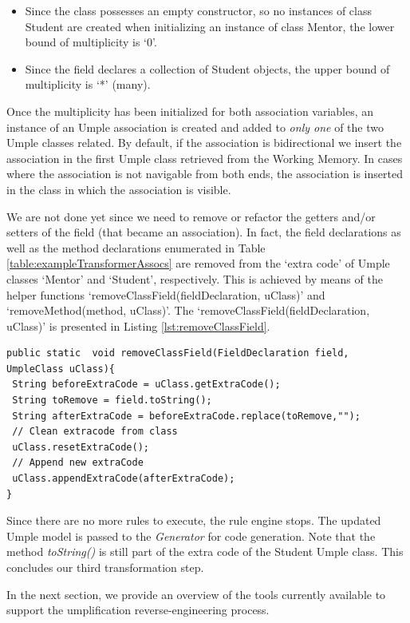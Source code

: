 \begin{itemize}
\item Since the class possesses an empty constructor, so no instances of class Student are created when initializing an instance of class Mentor, the lower bound of multiplicity is `0'.
\item Since the field declares a collection of Student objects, the upper bound of multiplicity is `*' (many).
\end{itemize}

Once the multiplicity has been initialized for both association variables, an instance of an Umple association is created and added to \textit{only one} of the two Umple classes related. By default, if the association is bidirectional we insert the association in the first Umple class retrieved from the Working Memory. In cases where the association is not navigable from both ends, the association is inserted in the class in which the association is visible.

We are not done yet since we need to remove or refactor the getters  and/or setters of the field (that became an association). In fact, the field declarations as well as the method declarations enumerated in Table \ref{table:exampleTransformerAssocs} are removed from the `extra code' of Umple classes `Mentor' and `Student', respectively. This is achieved by means of the helper functions `removeClassField(fieldDeclaration, uClass)' and `removeMethod(method, uClass)'. The `removeClassField(fieldDeclaration, uClass)' is presented in Listing \ref{lst:removeClassField}.

\begin{lstlisting}[style=java, label={lst:removeClassField}, caption=Function removeClassField]
public static  void removeClassField(FieldDeclaration field, UmpleClass uClass){
 String beforeExtraCode = uClass.getExtraCode();
 String toRemove = field.toString();
 String afterExtraCode = beforeExtraCode.replace(toRemove,"");
 // Clean extracode from class
 uClass.resetExtraCode();
 // Append new extraCode
 uClass.appendExtraCode(afterExtraCode);
}
\end{lstlisting}

Since there are no more rules to execute, the rule engine stops. The updated Umple model is passed to the \textit{Generator} for code generation. Note that the method \textit{toString()} is still part of the extra code of the Student Umple class. This concludes our third transformation step.

In the next section, we provide an overview of the tools currently available to support the umplification reverse-engineering process.

